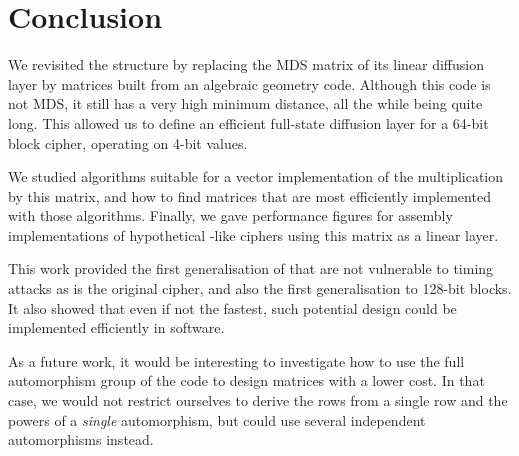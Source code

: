 \section{Conclusion}

We revisited the \shark{} structure by replacing the MDS matrix of its linear diffusion layer by matrices built from an algebraic geometry code.
Although this code is not MDS, it still has a very high minimum distance, all the while being quite long.
This allowed us to define an efficient full-state diffusion layer for a 64-bit block cipher, operating on 4-bit values.

We studied algorithms suitable for a vector implementation of the multiplication by this matrix, and how to find matrices that are most efficiently implemented with
those algorithms.
Finally, we gave performance figures for assembly implementations of hypothetical \shark-like ciphers using this matrix as a linear layer.

This work provided the first generalisation of \shark{} that are not vulnerable to timing attacks as is the
original cipher, and also the first generalisation to 128-bit blocks. It also showed that even if not the fastest, such potential design could be implemented efficiently in software.

As a future work, it would be interesting to investigate how to use the full automorphism group of the code to design matrices with a lower cost. In that case, we would not restrict
ourselves to derive the rows from a single row and the powers of a \emph{single} automorphism, but could use several independent automorphisms instead. 
